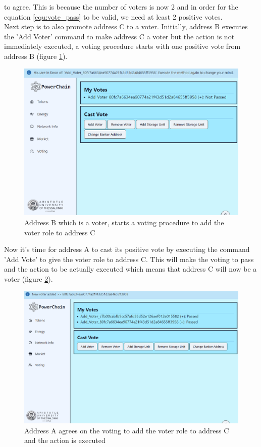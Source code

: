to agree. This is because the number of voters is now 2 and in order for the equation \ref{equ:vote_pass} to be valid,
we need at least 2 positive votes.\\
Next step is to also promote address C to a voter. Initially, address B executes the 'Add Voter' command to make address
C a voter but the action is not immediately executed, a voting procedure starts with one positive vote from address B (figure \ref{fig:add_voter_1}).
\begin{figure}[h!]
    \centering
    \includegraphics[width=\linewidth,frame,scale=0.7]{Figures/add_voter_1.png}
    \caption{Address B which is a voter, starts a voting procedure to add the voter role to address C}
    \label{fig:add_voter_1}
\end{figure}
Now it's time for address A to cast its positive vote by executing the command 'Add Vote' to give the voter
role to address C. This will make the voting to pass and the action to be actually executed which means that address C
will now be a voter (figure \ref{fig:add_voter_2}).\\
\begin{figure}[h!]
    \centering
    \includegraphics[width=\linewidth,frame,scale=0.7]{Figures/add_voter_2.png}
    \caption{Address A agrees on the voting to add the voter role to address C and the action is executed}
    \label{fig:add_voter_2}
\end{figure}
